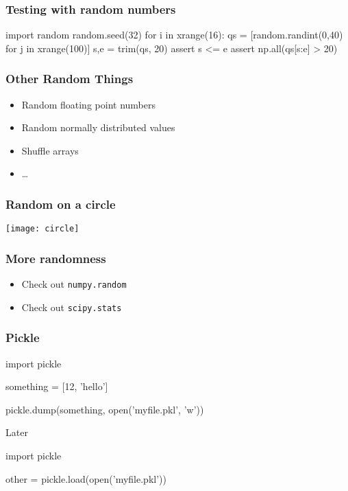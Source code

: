 \begin{frame}[fragile]
\frametitle{Testing with random numbers}

\begin{python}
import random
random.seed(32)
for i in xrange(16):
    qs = [random.randint(0,40) for j in xrange(100)]
    s,e = trim(qs, 20)
    assert s <= e
    assert np.all(qs[s:e] > 20)
\end{python}
\end{frame}

\begin{frame}[fragile]
\frametitle{Other Random Things}
\begin{itemize}
\item Random floating point numbers
\item Random normally distributed values
\item Shuffle arrays
\item \ldots
\end{itemize}
\end{frame}

\begin{frame}[fragile]
\frametitle{Random on a circle}

\centering
\texttt{[image: circle]}

\end{frame}

\begin{frame}[fragile]
\frametitle{More randomness}

\begin{itemize}
\item Check out \lstinline{numpy.random}
\item Check out \lstinline{scipy.stats}
\end{itemize}
\end{frame}

\begin{frame}[fragile]
\frametitle{Pickle}

\begin{python}
import pickle

something = [12, 'hello']

pickle.dump(something, open('myfile.pkl', 'w'))
\end{python}

Later

\begin{python}
import pickle

other = pickle.load(open('myfile.pkl'))
\end{python}
\end{frame}

